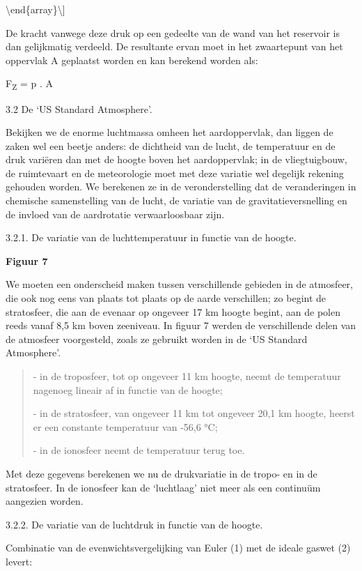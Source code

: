 \documentclass[]{article}
\begin{document}
\textbackslash{}end\{array\}\textbackslash{}{]}

De kracht vanwege deze druk op een gedeelte van de wand van het
reservoir is dan gelijkmatig verdeeld. De resultante ervan moet in het
zwaartepunt van het oppervlak A geplaatst worden en kan berekend worden
als:

F\textsubscript{Z} = p . A

3.2 De `US Standard Atmosphere'.

Bekijken we de enorme luchtmassa omheen het aardoppervlak, dan liggen de
zaken wel een beetje anders: de dichtheid van de lucht, de temperatuur
en de druk variëren dan met de hoogte boven het aardoppervlak; in de
vliegtuigbouw, de ruimtevaart en de meteorologie moet met deze variatie
wel degelijk rekening gehouden worden. We berekenen ze in de
veronderstelling dat de veranderingen in chemische samenstelling van de
lucht, de variatie van de gravitatieversnelling en de invloed van de
aardrotatie verwaarloosbaar zijn.

3.2.1. De variatie van de luchttemperatuur in functie van de hoogte.

\textbf{Figuur 7}

We moeten een onderscheid maken tussen verschillende gebieden in de
atmosfeer, die ook nog eens van plaats tot plaats op de aarde
verschillen; zo begint de stratosfeer, die aan de evenaar op ongeveer 17
km hoogte begint, aan de polen reeds vanaf 8,5 km boven zeeniveau. In
figuur 7 werden de verschillende delen van de atmosfeer voorgesteld,
zoals ze gebruikt worden in de `US Standard Atmosphere'.

\begin{quote}
- in de troposfeer, tot op ongeveer 11 km hoogte, neemt de temperatuur
nagenoeg lineair af in functie van de hoogte;

- in de stratosfeer, van ongeveer 11 km tot ongeveer 20,1 km hoogte,
heerst er een constante temperatuur van -56,6 °C;

- in de ionosfeer neemt de temperatuur terug toe.
\end{quote}

Met deze gegevens berekenen we nu de drukvariatie in de tropo- en in de
stratosfeer. In de ionosfeer kan de `luchtlaag' niet meer als een
continuüm aangezien worden.

3.2.2. De variatie van de luchtdruk in functie van de hoogte.

Combinatie van de evenwichtsvergelijking van Euler (1) met de ideale
gaswet (2) levert:
\end{document}
